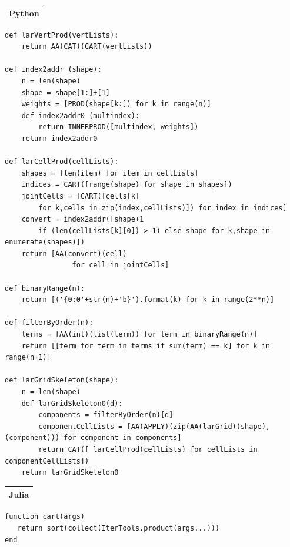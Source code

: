 \documentclass{article}
\begin{document}
\begin{flushleft} \small
\begin{center}
\begin{tabular}{|p{16cm}|}
\hline
\cellcolor[gray]{.9}Python\\
\hline
\end{tabular}
\end{center}
\vspace{2ex}
\begin{list}{}{} \item
\begin{Verbatim}[tabsize=3]
def larVertProd(vertLists):
    return AA(CAT)(CART(vertLists))
	
def index2addr (shape):
    n = len(shape)
    shape = shape[1:]+[1]
    weights = [PROD(shape[k:]) for k in range(n)]
    def index2addr0 (multindex):
        return INNERPROD([multindex, weights])
    return index2addr0

def larCellProd(cellLists):
    shapes = [len(item) for item in cellLists]
    indices = CART([range(shape) for shape in shapes])
    jointCells = [CART([cells[k] 
        for k,cells in zip(index,cellLists)]) for index in indices]
    convert = index2addr([shape+1
        if (len(cellLists[k][0]) > 1) else shape for k,shape in enumerate(shapes)])
    return [AA(convert)(cell) 
                for cell in jointCells]

def binaryRange(n):
    return [('{0:0'+str(n)+'b}').format(k) for k in range(2**n)]

def filterByOrder(n):
    terms = [AA(int)(list(term)) for term in binaryRange(n)]
    return [[term for term in terms if sum(term) == k] for k in range(n+1)]
                        
def larGridSkeleton(shape):
    n = len(shape)
    def larGridSkeleton0(d):
        components = filterByOrder(n)[d]
        componentCellLists = [AA(APPLY)(zip(AA(larGrid)(shape),(component))) for component in components]
        return CAT([ larCellProd(cellLists) for cellLists in componentCellLists])
    return larGridSkeleton0                        
\end{Verbatim}
\end{list}
   \vspace{2ex}
\begin{center}
\begin{tabular}{|p{16cm}|}
\hline
\cellcolor[gray]{.9}Julia\\
\hline
\end{tabular}
\end{center}
\vspace{2ex}
\begin{list}{}{} \item
\begin{Verbatim}[tabsize=4]
function cart(args)
   return sort(collect(IterTools.product(args...)))
end


\end{Verbatim}
\end{list}
\end{flushleft}
\end{document}
